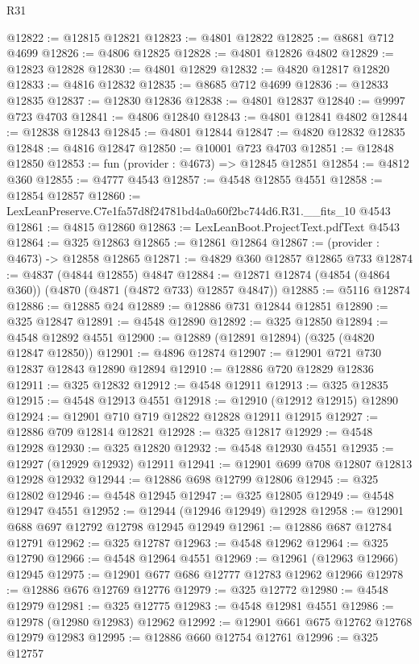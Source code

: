 \begin{lexlean}{R31}
\begin{coremodule}
@12822 := @12815 @12821
@12823 := @4801 @12822
@12825 := @8681 @712 @4699
@12826 := @4806 @12825
@12828 := @4801 @12826 @4802
@12829 := @12823 @12828
@12830 := @4801 @12829
@12832 := @4820 @12817 @12820
@12833 := @4816 @12832
@12835 := @8685 @712 @4699
@12836 := @12833 @12835
@12837 := @12830 @12836
@12838 := @4801 @12837
@12840 := @9997 @723 @4703
@12841 := @4806 @12840
@12843 := @4801 @12841 @4802
@12844 := @12838 @12843
@12845 := @4801 @12844
@12847 := @4820 @12832 @12835
@12848 := @4816 @12847
@12850 := @10001 @723 @4703
@12851 := @12848 @12850
@12853 := fun (provider : @4673) => @12845 @12851
@12854 := @4812 @360
@12855 := @4777 @4543
@12857 := @4548 @12855 @4551
@12858 := @12854 @12857
@12860 := LexLeanPreserve.C7e1fa57d8f24781bd4a0a60f2bc744d6.R31.__fits_10 @4543
@12861 := @4815 @12860
@12863 := LexLeanBoot.ProjectText.pdfText @4543
@12864 := @325 @12863
@12865 := @12861 @12864
@12867 := (provider : @4673) -> @12858 @12865
@12871 := @4829 @360 @12857 @12865 @733
@12874 := @4837 (@4844 @12855) @4847
@12884 := @12871 @12874 (@4854 (@4864 @360)) (@4870 (@4871 (@4872 @733) @12857 @4847))
@12885 := @5116 @12874
@12886 := @12885 @24
@12889 := @12886 @731 @12844 @12851
@12890 := @325 @12847
@12891 := @4548 @12890
@12892 := @325 @12850
@12894 := @4548 @12892 @4551
@12900 := @12889 (@12891 @12894) (@325 (@4820 @12847 @12850))
@12901 := @4896 @12874
@12907 := @12901 @721 @730 @12837 @12843 @12890 @12894
@12910 := @12886 @720 @12829 @12836
@12911 := @325 @12832
@12912 := @4548 @12911
@12913 := @325 @12835
@12915 := @4548 @12913 @4551
@12918 := @12910 (@12912 @12915) @12890
@12924 := @12901 @710 @719 @12822 @12828 @12911 @12915
@12927 := @12886 @709 @12814 @12821
@12928 := @325 @12817
@12929 := @4548 @12928
@12930 := @325 @12820
@12932 := @4548 @12930 @4551
@12935 := @12927 (@12929 @12932) @12911
@12941 := @12901 @699 @708 @12807 @12813 @12928 @12932
@12944 := @12886 @698 @12799 @12806
@12945 := @325 @12802
@12946 := @4548 @12945
@12947 := @325 @12805
@12949 := @4548 @12947 @4551
@12952 := @12944 (@12946 @12949) @12928
@12958 := @12901 @688 @697 @12792 @12798 @12945 @12949
@12961 := @12886 @687 @12784 @12791
@12962 := @325 @12787
@12963 := @4548 @12962
@12964 := @325 @12790
@12966 := @4548 @12964 @4551
@12969 := @12961 (@12963 @12966) @12945
@12975 := @12901 @677 @686 @12777 @12783 @12962 @12966
@12978 := @12886 @676 @12769 @12776
@12979 := @325 @12772
@12980 := @4548 @12979
@12981 := @325 @12775
@12983 := @4548 @12981 @4551
@12986 := @12978 (@12980 @12983) @12962
@12992 := @12901 @661 @675 @12762 @12768 @12979 @12983
@12995 := @12886 @660 @12754 @12761
@12996 := @325 @12757

\end{coremodule}
\end{lexlean}
